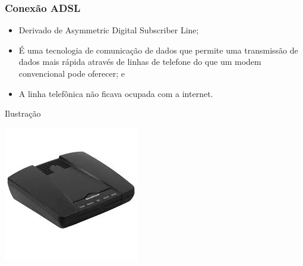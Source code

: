 \documentclass[aspectratio=169]{beamer} %
\begin{document}
\begin{frame}
	\frametitle{Conexão ADSL}
			
	\begin{itemize}
		\item Derivado de Asymmetric Digital Subscriber Line;
		\item É uma tecnologia de comunicação de dados que permite uma transmissão de dados mais rápida através de linhas de telefone do que um modem convencional pode oferecer; e
		\item A linha telefônica não ficava ocupada com a internet.
	\end{itemize} \vfill
	
	\begin{exampleblock}{Ilustra\c cão}
		\begin{center}
			\includegraphics[scale=0.4]{img/adsl}
		\end{center}
	\end{exampleblock}
\end{frame}
\end{document}
